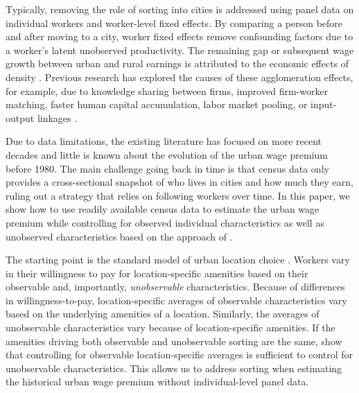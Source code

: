 \documentclass[12pt]{article}
\begin{document}
Typically, removing the role of sorting into cities is addressed using panel data on individual workers and worker-level fixed effects.
By comparing a person before and after moving to a city, worker fixed effects remove confounding factors due to a worker's latent unobserved productivity. 
The remaining gap or subsequent wage growth between urban and rural earnings is attributed to the economic effects of density \citep*{ahlfeldt2019economic, glaeser2008cities}. 
Previous research has explored the causes of these agglomeration effects, for example, due to knowledge sharing between firms, improved firm-worker matching, faster human capital accumulation, labor market pooling, or input-output linkages \citep*{BaumSnow_Pavan_2012,Combes_Duranton_Gobillon_2008,dauth2022matching, Glaeser_Mare_2001,gould2007cities,Yankow_2006,adenbaum2025there,card2024location}.

Due to data limitations, the existing literature has focused on more recent decades and little is known about the evolution of the urban wage premium before 1980.
The main challenge going back in time is that census data only provides a cross-sectional snapshot of who lives in cities and how much they earn, ruling out a strategy that relies on following workers over time.
In this paper, we show how to use readily available census data to estimate the urban wage premium while controlling for observed individual characteristics as well as unobserved characteristics based on the approach of \citet*{altonji2018estimating}.

The starting point is the standard model of urban location choice \citep*{roback1982wages, bayer2007unified, bayer2016dynamic}. 
Workers vary in their willingness to pay for location-specific amenities based on their observable and, importantly, \emph{unobservable} characteristics.
Because of differences in willingness-to-pay, location-specific averages of observable characteristics vary based on the underlying amenities of a location. 
Similarly, the averages of unobservable characteristics vary because of  location-specific amenities. 
If the amenities driving both observable and unobservable sorting are the same, \citet{altonji2018estimating} show that controlling for observable location-specific averages is sufficient to control for unobservable characteristics.
This allows us to address sorting when estimating the historical urban wage premium without individual-level panel data.
\end{document}
